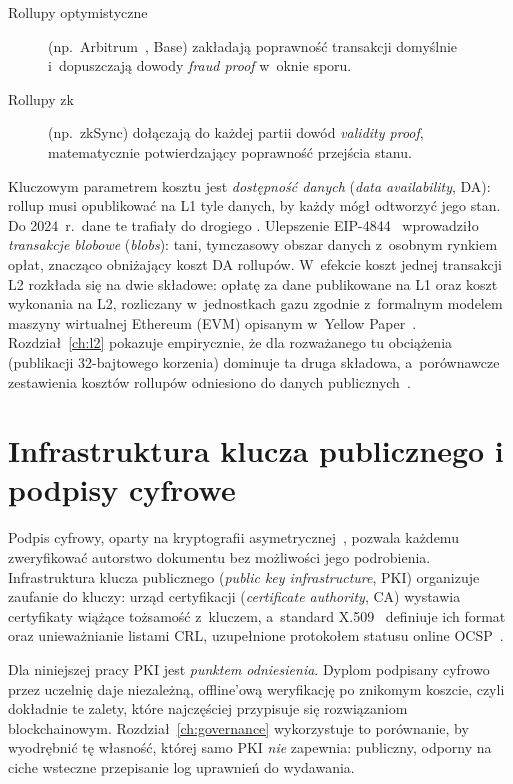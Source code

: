 \begin{description}
  \item[Rollupy optymistyczne] (np.\ Arbitrum~\cite{arbitrum-nitro}, Base)
        zakładają poprawność transakcji domyślnie i~dopuszczają dowody
        \emph{fraud proof} w~oknie sporu.
  \item[Rollupy zk] (np.\ zkSync) dołączają do każdej partii dowód
        \emph{validity proof}, matematycznie potwierdzający poprawność przejścia
        stanu.
\end{description}

Kluczowym parametrem kosztu jest \emph{dostępność danych} (\emph{data
availability}, DA): rollup musi opublikować na L1 tyle danych, by każdy mógł
odtworzyć jego stan. Do 2024~r.\ dane te trafiały do drogiego .
Ulepszenie EIP-4844~\cite{eip4844} wprowadziło \emph{transakcje blobowe}
(\emph{blobs}): tani, tymczasowy obszar danych z~osobnym rynkiem opłat, znacząco
obniżający koszt DA rollupów. W~efekcie koszt jednej transakcji L2 rozkłada się na
dwie składowe: opłatę za dane publikowane na L1 oraz koszt wykonania na L2,
rozliczany w~jednostkach gazu zgodnie z~formalnym modelem maszyny wirtualnej
Ethereum (EVM) opisanym w~Yellow Paper~\cite{wood-yellowpaper}.
Rozdział~\ref{ch:l2} pokazuje empirycznie, że dla rozważanego tu obciążenia
(publikacji 32-bajtowego korzenia) dominuje ta druga składowa, a~porównawcze
zestawienia kosztów rollupów odniesiono do danych publicznych~\cite{l2beat}.

\section{Infrastruktura klucza publicznego i podpisy cyfrowe}
\label{sec:pki}

Podpis cyfrowy, oparty na kryptografii asymetrycznej~\cite{diffiehellman1976},
pozwala każdemu zweryfikować autorstwo dokumentu bez możliwości jego podrobienia.
Infrastruktura klucza publicznego (\emph{public key infrastructure}, PKI)
organizuje zaufanie do kluczy: urząd certyfikacji (\emph{certificate authority},
CA) wystawia certyfikaty wiążące tożsamość z~kluczem, a~standard
X.509~\cite{rfc5280} definiuje ich format oraz unieważnianie listami CRL,
uzupełnione protokołem statusu online OCSP~\cite{rfc6960}.

Dla niniejszej pracy PKI jest \emph{punktem odniesienia}. Dyplom podpisany cyfrowo
przez uczelnię daje niezależną, offline'ową weryfikację po znikomym koszcie, czyli
dokładnie te zalety, które najczęściej przypisuje się rozwiązaniom blockchainowym.
Rozdział~\ref{ch:governance} wykorzystuje to porównanie, by wyodrębnić tę własność,
której samo PKI \emph{nie} zapewnia: publiczny, odporny na ciche wsteczne
przepisanie log uprawnień do wydawania.

